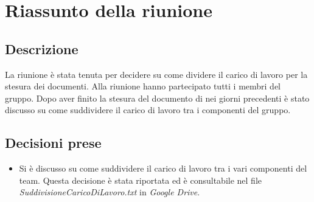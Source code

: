 \section{Riassunto della riunione}
\subsection{Descrizione}

La riunione è stata tenuta per decidere su come dividere il carico di lavoro per la stesura dei documenti. Alla riunione hanno partecipato tutti i membri del gruppo. Dopo aver finito la stesura del documento di \SdF nei giorni precedenti è stato discusso su come suddividere il carico di lavoro tra i componenti del gruppo. 

\subsection{Decisioni prese}
\begin{itemize}
\item Si è discusso su come suddividere il carico di lavoro tra i vari componenti del team. Questa decisione è stata riportata ed è consultabile nel file \textsl{SuddivisioneCaricoDiLavoro.txt} in \textit{Google Drive}.
\end{itemize}